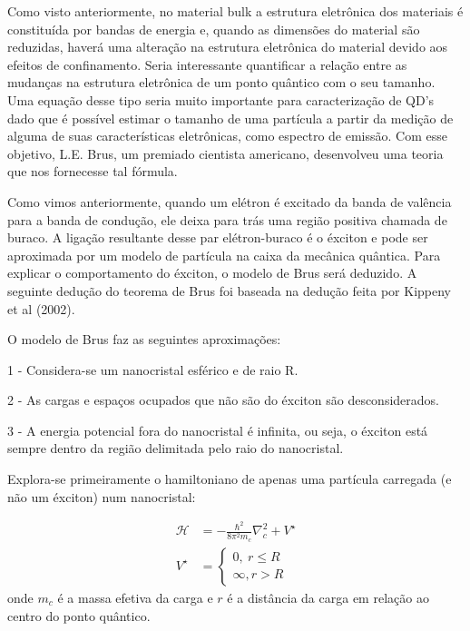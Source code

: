 
\par Como visto anteriormente, no material bulk a estrutura eletrônica dos materiais é constituída por  bandas de energia  e, quando as dimensões do material são reduzidas, haverá uma alteração na estrutura eletrônica do material devido aos efeitos de confinamento. Seria interessante quantificar a relação entre as mudanças na estrutura eletrônica de um ponto quântico com o seu tamanho. Uma equação desse tipo seria muito importante para caracterização de QD’s dado que é possível estimar o tamanho de uma partícula a partir da medição de alguma de suas características eletrônicas, como espectro de emissão. Com esse objetivo, L.E. Brus, um premiado cientista americano, desenvolveu uma teoria que nos fornecesse tal fórmula.

\par Como vimos anteriormente, quando um elétron é excitado da banda de valência para a banda de condução, ele deixa para trás uma região positiva chamada de buraco. A ligação resultante desse par elétron-buraco é o éxciton e pode ser aproximada por um modelo de partícula na caixa da mecânica quântica. Para explicar o comportamento do éxciton, o modelo de Brus será deduzido. A seguinte dedução do teorema de Brus foi baseada na dedução feita por Kippeny et al (2002).

\par O modelo de Brus faz as seguintes aproximações: 

\par 1 - Considera-se um nanocristal esférico e de raio R.

\par 2 - As cargas e espaços ocupados que não são do éxciton são desconsiderados.

\par 3 - A energia potencial fora do nanocristal é infinita, ou seja, o éxciton está sempre dentro da região delimitada pelo raio do nanocristal.

\par Explora-se primeiramente o hamiltoniano de apenas uma partícula carregada (e não um éxciton) num nanocristal:

\begin{align}
	\label{confinamento_9}
	\displaystyle \mathcal{H} &= -\frac{\hbar^2}{8\pi^2m_{c}}\nabla^2_{c} + V^{\star}\\
	\displaystyle 
		V^{\star} &=
		\left\{
          \begin{array}{ll}
            \displaystyle 0,\ r \leq R\\
            \displaystyle \infty, r > R
          \end{array}
        \right.
\end{align}
onde $m_{c}$ é a massa efetiva da carga e $r$ é a distância da carga em relação ao centro do ponto quântico.

